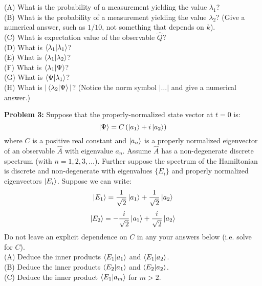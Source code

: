 \documentclass[12pt]{article}
\begin{document}
\noindent
(A) What is the probability of a measurement yielding the value $\lambda_1$?\\[5pt]

\noindent
(B) What is the probability of a measurement yielding the value $\lambda_2$?  (Give a numerical answer, such as $1/10$, not something that depends on $k$).\\[5pt]

\noindent
(C) What is expectation value of the observable $\hat{Q}$?\\[5pt]

\noindent
(D) What is $\braket{\lambda_1 | \lambda_1}$?\\[5pt]

\noindent
(E) What is $\braket{\lambda_1 | \lambda_2}$?\\[5pt]

\noindent
(F) What is $\braket{\lambda_1 | \Psi}$?\\[5pt]

\noindent
(G) What is $\braket{\Psi | \lambda_1}$?\\[5pt]

\noindent
(H) What is $|\braket{\lambda_2 | \Psi}|$?  (Notice the norm symbol $|\ldots|$ and give a numerical answer.)\\[5pt]
\newpage

\noindent
{\bf Problem 3:} Suppose that the properly-normalized state vector at $t=0$ is:
$$\ket{\Psi} = C \left( \ket{a_1} + i\ket{a_2} \right)$$
where $C$ is a positive real constant and $\ket{a_n}$ is a properly normalized eigenvector of an observable $\hat{A}$ with eigenvalue $a_n$.  Assume $\hat{A}$ has a non-degenerate discrete spectrum (with $n=1,2,3,\ldots$). Further suppose the spectrum of the Hamiltonian is discrete and non-degenerate with eigenvalues $\{E_i\}$ and properly normalized eigenvectors $\ket{E_i}$.  Suppose we can write:
$$\ket{E_1} = \frac{1}{\sqrt{2}} \ket{a_1} + \frac{1}{\sqrt{2}} \ket{a_2}$$
$$\ket{E_2} = -\frac{i}{\sqrt{2}} \ket{a_1} + \frac{i}{\sqrt{2}} \ket{a_2}$$
Do not leave an explicit dependence on $C$ in any your answers below (i.e. solve for $C$).\\[5pt]

\noindent
(A) Deduce the inner products $\braket{E_1|a_1}$ and $\braket{E_1|a_2}$.\\[5pt]

\noindent
(B) Deduce the inner products $\braket{E_2|a_1}$ and $\braket{E_2|a_2}$.\\[5pt]

\noindent
(C) Deduce the inner product $\braket{E_1|a_m}$ for $m>2$.\\[5pt]
\end{document}
